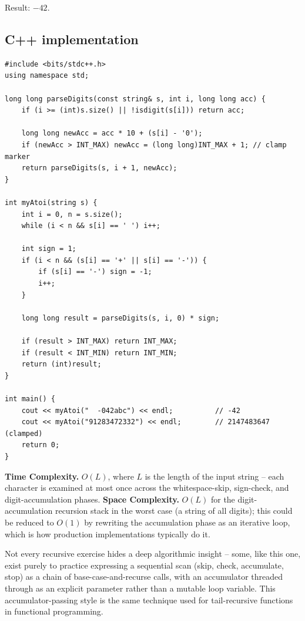 Result: $-42$.

\subsection*{C++ implementation}

\begin{lstlisting}
#include <bits/stdc++.h>
using namespace std;

long long parseDigits(const string& s, int i, long long acc) {
    if (i >= (int)s.size() || !isdigit(s[i])) return acc;

    long long newAcc = acc * 10 + (s[i] - '0');
    if (newAcc > INT_MAX) newAcc = (long long)INT_MAX + 1; // clamp marker
    return parseDigits(s, i + 1, newAcc);
}

int myAtoi(string s) {
    int i = 0, n = s.size();
    while (i < n && s[i] == ' ') i++;

    int sign = 1;
    if (i < n && (s[i] == '+' || s[i] == '-')) {
        if (s[i] == '-') sign = -1;
        i++;
    }

    long long result = parseDigits(s, i, 0) * sign;

    if (result > INT_MAX) return INT_MAX;
    if (result < INT_MIN) return INT_MIN;
    return (int)result;
}

int main() {
    cout << myAtoi("  -042abc") << endl;          // -42
    cout << myAtoi("91283472332") << endl;        // 2147483647 (clamped)
    return 0;
}
\end{lstlisting}

\begin{complexitybox}
\textbf{Time Complexity.} $O(L)$, where $L$ is the length of the input
string -- each character is examined at most once across the
whitespace-skip, sign-check, and digit-accumulation phases.
\textbf{Space Complexity.} $O(L)$ for the digit-accumulation recursion
stack in the worst case (a string of all digits); this could be reduced
to $O(1)$ by rewriting the accumulation phase as an iterative loop, which
is how production implementations typically do it.
\end{complexitybox}

\begin{takeawaybox}
Not every recursive exercise hides a deep algorithmic insight -- some, like
this one, exist purely to practice expressing a sequential scan (skip,
check, accumulate, stop) as a chain of base-case-and-recurse calls, with
an accumulator threaded through as an explicit parameter rather than a
mutable loop variable. This accumulator-passing style is the same
technique used for tail-recursive functions in functional programming.
\end{takeawaybox}
